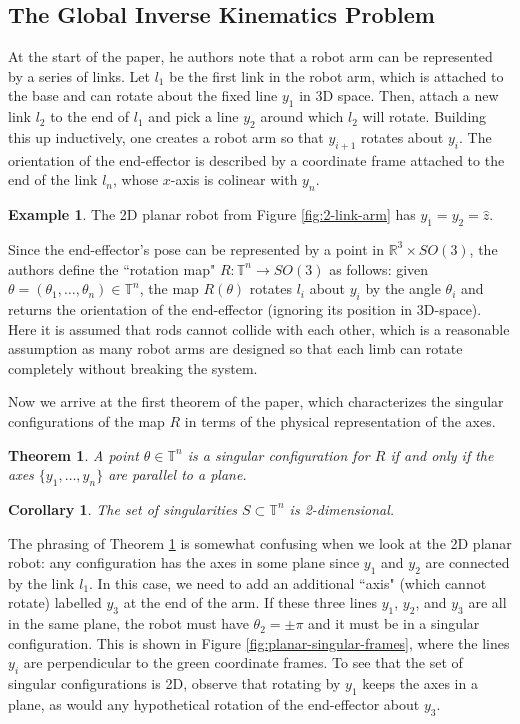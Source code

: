 \documentclass[12pt]{article}
\newtheorem{thm}{Theorem}
\newtheorem*{cor}{Corollary}
\theoremstyle{definition}
\newtheorem{example}{Example}
\begin{document}
\subsection{The Global Inverse Kinematics Problem}
At the start of the paper, he authors note that a robot arm can be represented
by a series of links. Let \(l_1\) be the first link in the robot arm, which is
attached to the base and can rotate about the fixed line \(y_1\) in 3D space.
Then, attach a new link \(l_2\) to the end of \(l_1\) and pick a line \(y_2\)
around which \(l_2\) will rotate. Building this up inductively, one creates a
robot arm so that \(y_{i+1}\) rotates about \(y_i\). The orientation of the
end-effector is described by a coordinate frame attached to the end of the link
\(l_n\), whose \(x\)-axis is colinear with \(y_n\).

\begin{example}
    The 2D planar robot from Figure \ref{fig:2-link-arm} has 
    \(y_1 = y_2 = \hat{z}\).
\end{example}

Since the end-effector's pose can be represented by a point in
\(\mathbb{R}^3\times SO(3)\), the authors define the ``rotation map" 
\(R : \mathbb{T}^n \rightarrow SO(3)\) as follows: 
given \(\theta = (\theta_1,\ldots,\theta_n) \in \mathbb{T}^n\),
the map \(R(\theta)\) rotates \(l_i\) about \(y_i\) by the angle \(\theta_i\)
and returns the orientation of the end-effector (ignoring its position in
3D-space). Here it is assumed that rods cannot collide with each other, which
is a reasonable assumption as many robot arms are designed so that each limb can
rotate completely without breaking the system.

Now we arrive at the first theorem of the paper, which characterizes the singular
configurations of the map \(R\) in terms of the physical representation of the
axes.

\begin{thm}\label{thm:singular-plane}
    A point \(\theta \in \mathbb{T}^n\) is a singular configuration for \(R\) if
    and only if the axes \(\{y_1,\ldots,y_n\}\) are parallel to a plane.
\end{thm}
\begin{cor}
    The set of singularities \(S \subset \mathbb{T}^n\) is 2-dimensional.
\end{cor}

The phrasing of Theorem \ref{thm:singular-plane} is somewhat confusing when we
look at the 2D planar robot: any configuration has the axes in some plane since \(y_1\) and
\(y_2\) are connected by the link \(l_1\). 
In this case, we need to add an additional ``axis" (which cannot rotate) labelled
\(y_3\) at the end of the arm. If these three lines \(y_1\), \(y_2\), and \(y_3\)
are all in the same plane, the robot must have \(\theta_2 = \pm \pi\) and it
must be in a singular configuration. This is shown in Figure
\ref{fig:planar-singular-frames}, where the lines \(y_i\) are perpendicular to the
green coordinate frames.
To see that the set of singular configurations is 2D, observe that rotating by
\(y_1\) keeps the axes in a plane, as would any hypothetical rotation of the
end-effector about \(y_3\).
\end{document}
